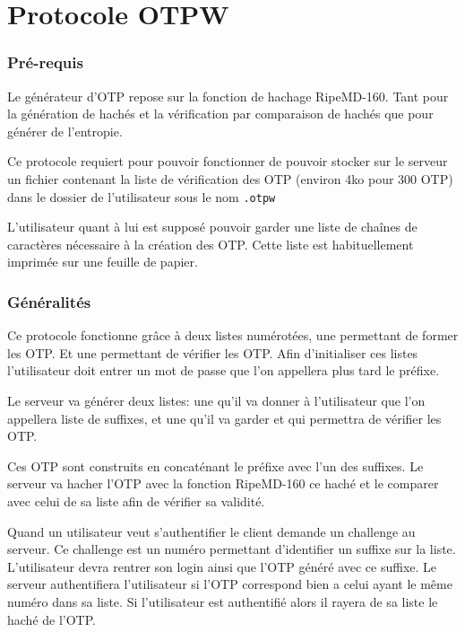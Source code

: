 \documentclass{../res/univ-projet}
\begin{document}
\setcounter{section}{0}
\part{Protocole OTPW}
\section{Pré-requis}
        Le générateur d'OTP repose sur la fonction de hachage RipeMD-160. Tant pour
    la génération de hachés et la vérification par comparaison de hachés
    que pour générer de l'entropie.

        Ce protocole requiert pour pouvoir fonctionner de pouvoir stocker
    sur le serveur un fichier contenant la liste de vérification des OTP (environ 
    4ko pour 300 OTP) dans le dossier de l'utilisateur sous le nom \verb?.otpw?
    
        L'utilisateur quant à lui est supposé pouvoir garder une liste de chaînes
    de caractères nécessaire à la création des OTP. Cette liste est habituellement
    imprimée sur une feuille de papier.

\section{Généralités}
        Ce protocole fonctionne grâce à deux listes numérotées, une permettant 
    de former les OTP. Et une permettant de vérifier les OTP. Afin d'initialiser
    ces listes l'utilisateur doit entrer un mot de passe que l'on appellera plus
    tard le préfixe. 
    
        Le serveur va générer deux listes: une qu'il va donner à l'utilisateur que
    l'on appellera liste de suffixes, et une qu'il va garder et qui permettra de
    vérifier les OTP.

        Ces OTP sont construits en concaténant le préfixe avec l'un des suffixes.
    Le serveur va hacher l'OTP avec la fonction RipeMD-160 ce haché et le comparer
    avec celui de sa liste afin de vérifier sa validité.

        Quand un utilisateur veut s'authentifier le client demande un challenge 
    au serveur. Ce challenge est un numéro permettant d'identifier un suffixe sur
    la liste. L'utilisateur devra rentrer son login ainsi que l'OTP généré avec
    ce suffixe. Le serveur authentifiera l'utilisateur si l'OTP correspond bien 
    a celui ayant le même numéro dans sa liste. Si l'utilisateur est authentifié
    alors il rayera de sa liste le haché de l'OTP.
\end{document}
